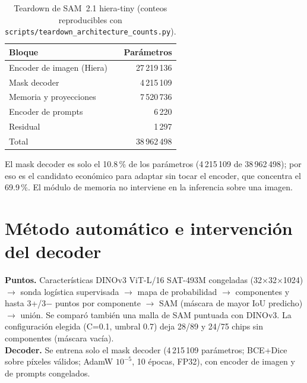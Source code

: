 \documentclass[11pt,twocolumn,a4paper]{article}
\begin{document}
\begin{table}[h]\centering\footnotesize\caption{Teardown de SAM~2.1 hiera-tiny (conteos reproducibles con \texttt{scripts/teardown\_architecture\_counts.py}).}
\begin{tabular}{@{}lr@{}}\toprule
Bloque & Par\'ametros\\\midrule
Encoder de imagen (Hiera) & 27\,219\,136\\
Mask decoder & 4\,215\,109\\
Memoria y proyecciones & 7\,520\,736\\
Encoder de prompts & 6\,220\\
Residual & 1\,297\\\midrule
Total & 38\,962\,498\\\bottomrule
\end{tabular}\end{table}
El mask decoder es solo el 10.8\,\% de los par\'ametros (4\,215\,109 de 38\,962\,498); por eso es el candidato econ\'omico para adaptar sin tocar el encoder, que concentra el 69.9\,\%. El m\'odulo de memoria no interviene en la inferencia sobre una imagen.

\section{M\'etodo autom\'atico e intervenci\'on del decoder}
\textbf{Puntos.} Caracter\'isticas DINOv3 ViT-L/16 SAT-493M congeladas (32$\times$32$\times$1024) $\to$ sonda log\'istica supervisada $\to$ mapa de probabilidad $\to$ componentes y hasta 3+/3$-$ puntos por componente $\to$ SAM (m\'ascara de mayor IoU predicho) $\to$ uni\'on. Se compar\'o tambi\'en una malla de SAM puntuada con DINOv3. La configuraci\'on elegida (C=0.1, umbral 0.7) deja 28/89 y 24/75 chips sin componentes (m\'ascara vac\'ia).\\
\textbf{Decoder.} Se entrena solo el mask decoder (4\,215\,109 par\'ametros; BCE+Dice sobre p\'ixeles v\'alidos; AdamW $10^{-5}$, 10 \'epocas, FP32), con encoder de imagen y de prompts congelados.
\end{document}
